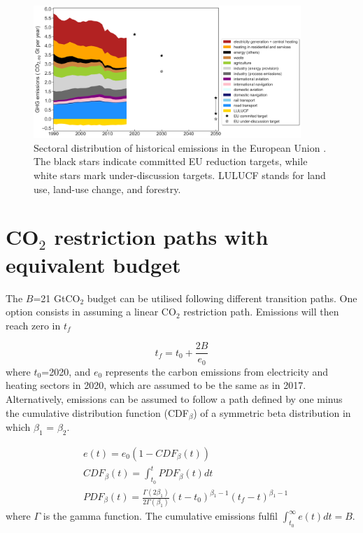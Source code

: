 \documentclass[3p]{elsarticle} %
\begin{document}
\begin{figure}[!h]
\centering
\includegraphics[width=0.9\textwidth]{figures/historical_sectoral_emissions.png}
\caption{Sectoral distribution of historical emissions in the European Union \cite{UNFCCC_inventory}. The black stars indicate committed EU reduction targets, while white stars mark under-discussion targets. LULUCF stands for land use, land-use change, and forestry.} \label{fig_historical_emissions} 
\end{figure}

\FloatBarrier

\section{CO$_2$ restriction paths with equivalent budget}

The $B$=21 GtCO$_2$ budget can be utilised following different transition paths. One option consists in assuming a linear CO$_2$ restriction path. Emissions will then reach zero in $t_f$

\begin{equation}
	t_f=t_0+\frac{2B}{e_0}
\end{equation}
where $t_0$=2020, and $e_0$ represents the carbon emissions from electricity and heating sectors in 2020, which are assumed to be the same as in 2017. \\

Alternatively, emissions can be assumed to follow a path defined by one minus the cumulative distribution function (CDF$_\beta$) of a symmetric beta distribution in which $\beta_1$ = $\beta_2$. 

\begin{equation}
\begin{aligned}
&	e (t) = e_0(1- CDF_{\beta}(t)) \\
&	CDF_{\beta} (t) =\int_{t_0}^{t} PDF_{\beta}(t) dt \\
&	PDF_{\beta} (t) =  \frac{\Gamma(2\beta_1)}{2\Gamma(\beta_1)} (t-t_0)^{\beta_1-1} (t_f-t)^{\beta_1-1}
\end{aligned}
\end{equation}
where $\Gamma$ is the gamma function. The cumulative emissions fulfil $\int_{t_0}^{\infty} e(t) dt =B$. \\
\end{document}
